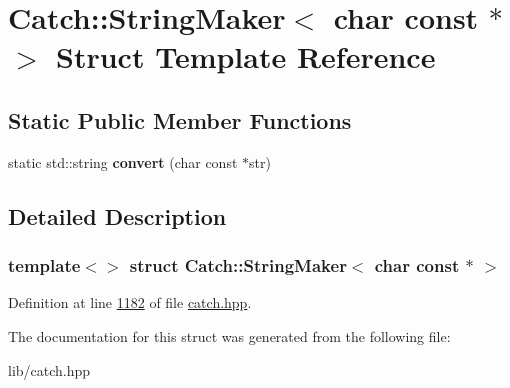 \hypertarget{structCatch_1_1StringMaker_3_01char_01const_01_5_01_4}{}\section{Catch\+::String\+Maker$<$ char const $\ast$ $>$ Struct Template Reference}
\label{structCatch_1_1StringMaker_3_01char_01const_01_5_01_4}
\subsection*{Static Public Member Functions}
\begin{DoxyCompactItemize}
\item 
\mbox{\label{structCatch_1_1StringMaker_3_01char_01const_01_5_01_4_a20813965ad59cdf6d1f874f47158432d}} 
static std\+::string {\bfseries convert} (char const $\ast$str)
\end{DoxyCompactItemize}


\subsection{Detailed Description}
\subsubsection*{template$<$$>$\newline
struct Catch\+::\+String\+Maker$<$ char const $\ast$ $>$}



Definition at line \mbox{\hyperlink{catch_8hpp_source_l01182}{1182}} of file \mbox{\hyperlink{catch_8hpp_source}{catch.\+hpp}}.



The documentation for this struct was generated from the following file\+:\begin{DoxyCompactItemize}
\item 
lib/catch.\+hpp\end{DoxyCompactItemize}
